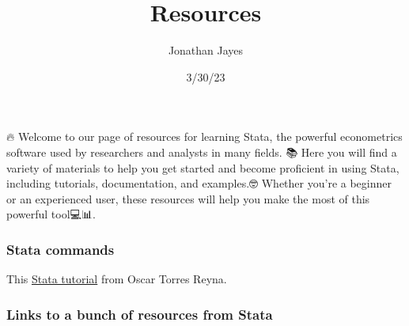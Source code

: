 \documentclass[
  letterpaper,
  DIV=11,
  numbers=noendperiod]{scrartcl}
\title{Resources}
\author{Jonathan Jayes}
\date{3/30/23}
\renewcommand*\contentsname{Table of contents}
\newcommand\contentsname{Table of contents}
\begin{document}
\maketitle
\ifdefined\Shaded\renewenvironment{Shaded}{\begin{tcolorbox}[breakable, boxrule=0pt, enhanced, borderline west={3pt}{0pt}{shadecolor}, frame hidden, interior hidden, sharp corners]}{\end{tcolorbox}}\fi

\renewcommand*\contentsname{Table of contents}
{
\hypersetup{linkcolor=}
\setcounter{tocdepth}{3}
\tableofcontents
}
🔥 Welcome to our page of resources for learning Stata, the powerful
econometrics software used by researchers and analysts in many fields.
📚 Here you will find a variety of materials to help you get started and
become proficient in using Stata, including tutorials, documentation,
and examples.🤓 Whether you're a beginner or an experienced user, these
resources will help you make the most of this powerful tool💻📊.

\hypertarget{stata-commands}{%
\subsubsection{Stata commands}\label{stata-commands}}

This \href{StataTutorial.pdf}{Stata tutorial} from Oscar Torres Reyna.

\hypertarget{links-to-a-bunch-of-resources-from-stata}{%
\subsubsection{Links to a bunch of resources from
Stata}\label{links-to-a-bunch-of-resources-from-stata}}
\end{document}
